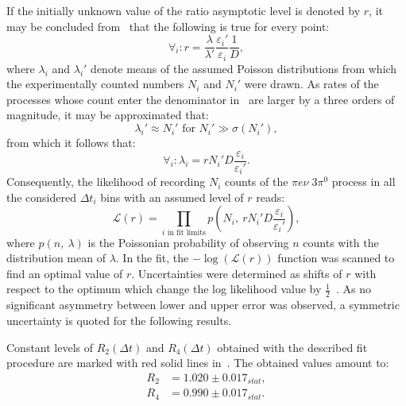 If the initially unknown value of the ratio asymptotic level is denoted by $r$, it may be concluded from~ that the following is true for every point:
\begin{equation}
  \label{eq:fit_true_r}
  \forall_i: r = \frac{\lambda}{\lambda'} \frac{\varepsilon_i'}{\varepsilon_i} \frac{1}{D},
\end{equation}
where $\lambda_i$ and $\lambda_i'$ denote means of the assumed Poisson distributions from which the experimentally counted numbers $N_i$ and $N_i'$ were drawn. As rates of the processes whose count enter the denominator in~ are larger by a three orders of magnitude, it may be approximated that:
\begin{equation}
  \label{eq:fit_approx}
  \lambda_i'{\approx} N_i' \text{\ \ for\ \ } {N_i'\gg\sigma(N_i')},  
\end{equation}
from which it follows that:
\begin{equation}
  \label{eq:fit_n_mean}
  \forall_i:\lambda_i = r N_i'D\frac{\varepsilon_i}{\varepsilon_i'}.
\end{equation}
Consequently, the likelihood of recording $N_i$ counts of the $\pi e\nu\;3\pi^0$ process in all the considered $\Delta t_i$ bins with an assumed level of $r$ reads:
\begin{equation}
  \label{eq:fit_likelihood}
  \mathcal{L}(r) = \prod_{i \text{ in fit limits}} p\left( N_i,\: r N_i'D\frac{\varepsilon_i}{\varepsilon_i'} \right),
\end{equation}
where $p(n,\:\lambda)$ is the Poissonian probability of observing $n$ counts with the distribution mean of $\lambda$.
In the fit, the $-\log\left(\mathcal{L}(r)\right)$ function was scanned to find an optimal value of $r$. Uncertainties were determined as shifts of $r$ with respect to the optimum which change the log likelihood value by $\frac{1}{2}$~\cite{behnke}. As no significant asymmetry between lower and upper error was observed, a symmetric uncertainty is quoted for the following results.

Constant levels of $R_2(\Delta t)$ and $R_4(\Delta t)$ obtained with the described fit procedure are marked with red solid lines in~. The obtained values amount to:
\begin{eqnarray}
  \label{eq:fit_results_statonly}
  R_2 &= 1.020 \pm 0.017_{stat},\\
  R_4 &= 0.990 \pm 0.017_{stat}.
\end{eqnarray}

